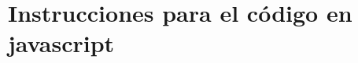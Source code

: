 \documentclass[10pt, spanish]{article}
\theoremstyle{definition}
\theoremstyle{break}
\begin{document}

\appendix

\section{Instrucciones para el código en javascript}
\end{document}
